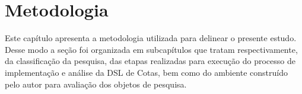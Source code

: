 \chapter{Metodologia}
\label{metodologia}

Este capítulo apresenta a metodologia utilizada para delinear o presente estudo. Desse modo a seção foi organizada em subcapítulos que tratam respectivamente, da classificação da pesquisa, das etapas realizadas para execução do processo de implementação e análise da DSL de Cotas, bem como do ambiente construído pelo autor para avaliação dos objetos de pesquisa.





 
 

 
 